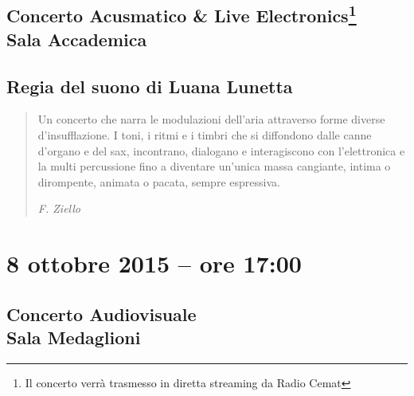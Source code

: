\documentclass[8pt, twoside, a5paper]{extreport}
\begin{document}
\subsection*{{\small Concerto Acusmatico \& Live Electronics\footnote{ Il concerto verrà trasmesso in diretta streaming da Radio Cemat}} \\
	\textsf{Sala Accademica}}

{\fontsize{30}{30} }

\subsection*{\textsf{Regia del suono di Luana Lunetta}}

\begin{quote}
{\svolk \small
Un concerto che narra le modulazioni dell’aria attraverso forme diverse d’insufflazione. I toni, i ritmi e i timbri che si diffondono dalle canne d’organo e del sax, incontrano, dialogano e interagiscono con l’elettronica e la multi percussione fino a diventare un’unica massa cangiante, intima o dirompente, animata o pacata, sempre espressiva.}

\emph{F. Ziello}
\end{quote}    




\begin{multicols}{2}




\end{multicols}

\clearpage


\section*{8 ottobre 2015 -- ore 17:00}

\subsection*{{\small Concerto Audiovisuale} \\
	\textsf{Sala Medaglioni}}
\end{document}
